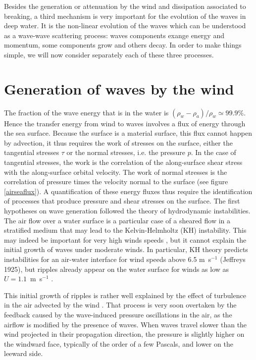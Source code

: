 Besides the generation or attenuation by the wind and dissipation associated to breaking, a third mechanism is very important for the 
evolution of the waves in deep water. It is the non-linear evolution of the waves which can be understood as a wave-wave scattering process: waves components 
exange energy and momentum, some components grow and others decay. In order to make things simple, we will now consider separately each of these three processes. 

\section{Generation of waves by the wind}
The fraction of the wave energy that is in the water is $(\rho_w -\rho_a)/\rho_w \simeq 99.9$\%. Hence the transfer energy from wind to waves 
involves a flux of energy through the sea surface. Because the surface is a material surface, this flux cannot happen by advection, it thus requires the 
work of stresses on the surface, either the tangential stresses $\tau$ or the normal stresses, i.e. the pressure $p$. In the case of tangential stresses, 
the work is the correlation of 
the along-surface shear stress with the along-surface orbital velocity. The work of normal stresses is the correlation of pressure times the velocity normal to the surface
 (see figure \ref{airseaflux}). A quantification of these energy fluxes thus require the identification of processes that produce pressure and shear stresses on the surface. 
The first hypotheses on wave generation followed the theory of hydrodynamic instabilities. The air flow over a water surface is a particular case of a sheared flow in a stratified 
medium that may lead to the Kelvin-Helmholtz (KH) instability. This may indeed be important for very high winds speeds \citep{Soloviev&al.2014}, but it cannot explain the 
initial growth of waves under moderate winds. In particular, KH theory predicts instabilities for an air-water interface for wind speeds above 6.5 m~s$^{-1}$ (Jeffreys 1925), 
but ripples already appear on the water surface for winds as low as  $U= 1.1$~m~s$^{-1}$ \citep{Kahma&Donelan1988}. 

This initial growth of ripples is rather well explained by the effect of turbulence in the air advected by the wind \cite{Phillips1957}. 
That process is very soon overtaken by the feedback caused by the wave-induced pressure oscillations in the air, as the airflow is modified by the presence of waves. 
 When waves travel slower than the wind projected in their propagation direction, the pressure is slightly higher on the windward face, typically of the order of a few Pascals,
and lower on the leeward side. 


